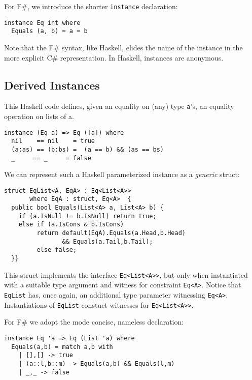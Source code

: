\documentclass[preprint]{sig-alternate-05-2015}
\begin{document}
For F\#, we introduce the shorter \lstinline{instance} declaration:
\begin{lstlisting}
instance Eq int where 
  Equals (a, b) = a = b
\end{lstlisting}

Note that the F\# syntax, like Haskell, elides the name of the instance in the more explicit C\# representation.
In Haskell, instances are anonymous.


\subsection{Derived Instances}

This Haskell code defines, given an equality on (any) type \lstinline{a}'s, an equality operation on lists of a.
\begin{lstlisting}
instance (Eq a) => Eq ([a]) where 
  nil    == nil    = true
  (a:as) == (b:bs) =  (a == b) && (as == bs)
  _     == _     = false
\end{lstlisting}


We can represent such a Haskell parameterized instance as a \emph{generic} struct:

\begin{lstlisting}
struct EqList<A, EqA> : Eq<List<A>>
       where EqA : struct, Eq<A>  {
  public bool Equals(List<A> a, List<A> b) {
    if (a.IsNull != b.IsNull) return true;
    else if (a.IsCons & b.IsCons) 
         return default(EqA).Equals(a.Head,b.Head) 
                && Equals(a.Tail,b.Tail);
         else false;
  }}
\end{lstlisting}

This struct implements the interface \lstinline{Eq<List<A>>}, but only when instantiated with a suitable type argument and witness for constraint \lstinline{Eq<A>}.
Notice that \lstinline{EqList} has, once again, an additional type parameter witnessing \lstinline{Eq<A>}.
Instantiations of \lstinline{EqList} constuct witnesses for \lstinline{Eq<List<A>>}.

For F\# we adopt the mode concise, nameless declaration:

\begin{lstlisting}
instance Eq 'a => Eq (List 'a) where 
  Equals(a,b) = match a,b with
    | [],[] -> true
    | (a::l,b::m) -> Equals(a,b) && Equals(l,m)
    | _,_ -> false
\end{lstlisting}
\end{document}
